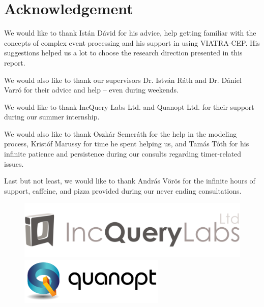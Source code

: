\chapter*{Acknowledgement}
\label{chap:acknowledge}

We would like to thank Istán Dávid for his advice, help getting familiar with the concepts of complex event processing and his support in using VIATRA-CEP.
His suggestions helped us a lot to choose the research direction presented in this report.

We would also like to thank our supervisors Dr. István Ráth and Dr. Dániel Varró
for their advice and help -- even during weekends. 

We would like to thank IncQuery Labs Ltd. and Quanopt Ltd. for their support during our summer internship.

We would also like to thank Oszkár Semeráth for the help in the modeling process, Kristóf Marussy for time he spent helping us, and Tamás Tóth for his infinite patience and persistence during our consults regarding timer-related issues.

Last but not least, we would like to thank András Vörös for the infinite hours of support, caffeine, and pizza provided during our never ending consultations.
\vspace{5ex}
\noindent\begin{figure}[h]
	\begin{minipage}{0.49\linewidth}
		\centering
		\includegraphics[width=0.8\linewidth]{include/figures/incquerylabs}
	\end{minipage}
	\begin{minipage}{0.49\linewidth}
		\centering
		\includegraphics[width=0.8\linewidth]{include/figures/quanopt}
	\end{minipage}
\end{figure}